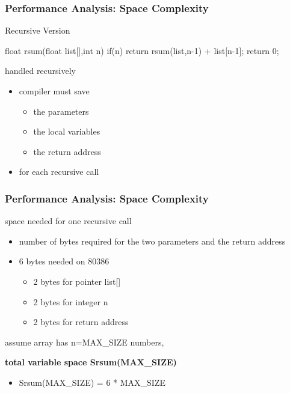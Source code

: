 \documentclass[newPxFont,sthlmFooter,nooffset]{beamer}
\begin{document}
\begin{frame}[t, fragile]
  \frametitle{Performance Analysis: Space Complexity}
Recursive Version
\begin{codedef}
float rsum(float list[],int n) {
   if(n) return rsum(list,n-1) + list[n-1]; 
   return 0;
}
\end{codedef}
handled recursively
\begin{itemize}
\item compiler must save
  \begin{itemize}
  \item the parameters
  \item the local variables
  \item the return address
  \end{itemize}
\item for each recursive call
\end{itemize}

\end{frame}

\begin{frame}[t]
  \frametitle{Performance Analysis: Space Complexity}
space needed for one recursive call
\begin{itemize}
\item number of bytes required for the two parameters and the return
  address
\item 6 bytes needed on 80386
  \begin{itemize}
  \item 2 bytes for pointer list[]
  \item 2 bytes for integer n
  \item 2 bytes for return address
  \end{itemize}

\end{itemize}

\textsf{assume} array has n=MAX\_SIZE numbers, 

\textbf{total variable space Srsum(MAX\_SIZE)}
\begin{itemize}
\item Srsum(MAX\_SIZE) = 6 * MAX\_SIZE
\end{itemize}

\end{frame}
\end{document}
